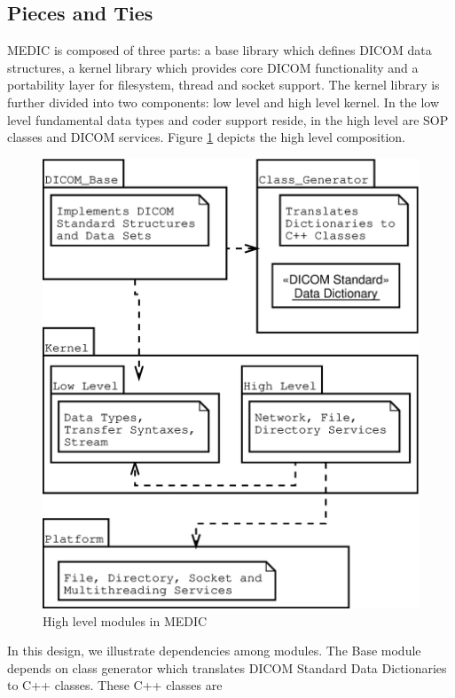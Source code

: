\documentclass[a4paper,10pt]{article}
\begin{document}
\subsection{Pieces and Ties}

MEDIC is composed of three parts: a base library which defines DICOM data
structures, a kernel library which provides core DICOM functionality and
a portability layer for filesystem, thread and socket support. The
kernel library is further divided into two components: low level and
high level kernel. In the low level fundamental data types and coder
support reside, in the high level are SOP classes and DICOM services.
Figure \ref{fig:modules} depicts the high level composition.

\begin{figure}[htbp]
  \begin{center}
    \includegraphics[scale=0.35]{medic-modules.eps}
    \caption{High level modules in MEDIC}
    \label{fig:modules}
  \end{center}
\end{figure}

In this design, we illustrate dependencies among modules. The
Base module depends on class generator which translates DICOM Standard
Data Dictionaries to C++ classes. These C++ classes are 
\end{document}
